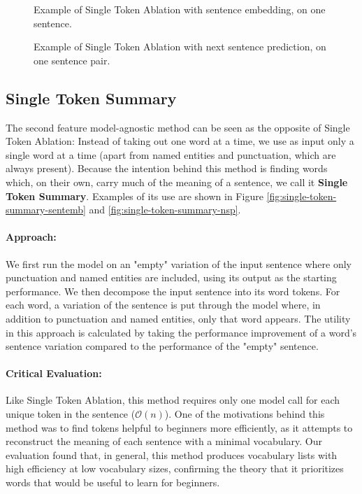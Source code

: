 \begin{figure}[H]
	
	\caption{Example of Single Token Ablation with sentence embedding, on one sentence.}
	\label{fig:single-token-ablation-sentemb}
\end{figure}

\begin{figure}[H]
	
	\caption{Example of Single Token Ablation with next sentence prediction, on one sentence pair.}
	\label{fig:single-token-ablation-nsp}
\end{figure}

\subsection{Single Token Summary}
The second feature model-agnostic method can be seen as the opposite of Single Token Ablation:
Instead of taking out one word at a time, we use as input only a single word at a time (apart from named entities and punctuation, which are always present).
Because the intention behind this method is finding words which, on their own, carry much of the meaning of a sentence, we call it \textbf{Single Token Summary}.
Examples of its use are shown in Figure \ref{fig:single-token-summary-sentemb} and \ref{fig:single-token-summary-nsp}.

\paragraph{Approach:}
We first run the model on an "empty" variation of the input sentence where only punctuation and named entities are included, using its output as the starting performance.
We then decompose the input sentence into its word tokens.
For each word, a variation of the sentence is put through the model where, in addition to punctuation and named entities, only that word appears.
The utility in this approach is calculated by taking the performance improvement of a word's sentence variation compared to the performance of the "empty" sentence.

\paragraph{Critical Evaluation:}
Like Single Token Ablation, this method requires only one model call for each unique token in the sentence ($\mathcal{O}(n)$).
One of the motivations behind this method was to find tokens helpful to beginners more efficiently, as it attempts to reconstruct the meaning of each sentence with a minimal vocabulary.
Our evaluation found that, in general, this method produces vocabulary lists with high efficiency at low vocabulary sizes, confirming the theory that it prioritizes words that would be useful to learn for beginners.

